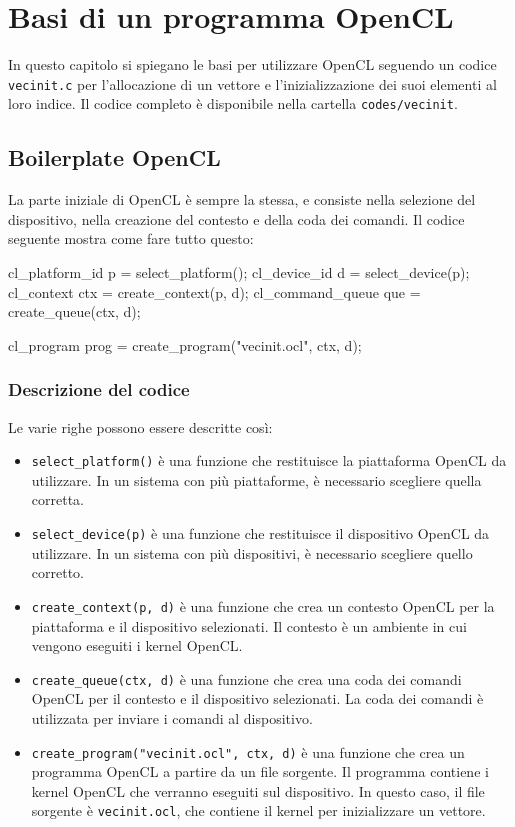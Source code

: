 \chapter{Basi di un programma OpenCL}\label{chap:opencl_basi}
In questo capitolo si spiegano le basi per utilizzare OpenCL seguendo un codice \texttt{vecinit.c} per l'allocazione di un vettore e l'inizializzazione dei suoi elementi al loro indice. Il codice completo è disponibile nella cartella \texttt{codes/vecinit}.

\section{Boilerplate OpenCL}\label{sec:opencl_basi_device_selection}
La parte iniziale di OpenCL è sempre la stessa, e consiste nella selezione del dispositivo, nella creazione del contesto e della coda dei comandi. Il codice seguente mostra come fare tutto questo:

\begin{code}[caption={Boilerplate OpenCL}, label={code:opencl_basi_boilerplate}]
    cl_platform_id p = select_platform();
    cl_device_id d = select_device(p);
    cl_context ctx = create_context(p, d);
    cl_command_queue que = create_queue(ctx, d);

    cl_program prog = create_program("vecinit.ocl", ctx, d);
\end{code}

\subsection*{Descrizione del codice}
Le varie righe possono essere descritte così:
\begin{itemize}
    \item \texttt{select\_platform()} è una funzione che restituisce la piattaforma OpenCL da utilizzare. In un sistema con più piattaforme, è necessario scegliere quella corretta.
    \item \texttt{select\_device(p)} è una funzione che restituisce il dispositivo OpenCL da utilizzare. In un sistema con più dispositivi, è necessario scegliere quello corretto.
    \item \texttt{create\_context(p, d)} è una funzione che crea un contesto OpenCL per la piattaforma e il dispositivo selezionati. Il contesto è un ambiente in cui vengono eseguiti i kernel OpenCL.
    \item \texttt{create\_queue(ctx, d)} è una funzione che crea una coda dei comandi OpenCL per il contesto e il dispositivo selezionati. La coda dei comandi è utilizzata per inviare i comandi al dispositivo.
    \item \texttt{create\_program("vecinit.ocl", ctx, d)} è una funzione che crea un programma OpenCL a partire da un file sorgente. Il programma contiene i kernel OpenCL che verranno eseguiti sul dispositivo. In questo caso, il file sorgente è \texttt{vecinit.ocl}, che contiene il kernel per inizializzare un vettore.
\end{itemize}


